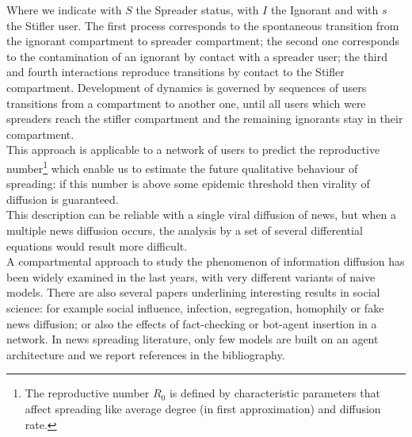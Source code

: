 Where we indicate with $S$ the Spreader status, with $I$ the Ignorant and with $s$ the Stifler user. 
The first process corresponds to the spontaneous transition from the ignorant compartment to spreader compartment;
 the second one corresponds to the contamination of an ignorant by contact with a spreader user; 
the third and fourth interactions reproduce transitions by contact to the Stifler compartment.
Development of dynamics is governed by sequences of users transitions from a compartment to another one, until all users which were spreaders reach the stifler compartment and the remaining ignorants stay in their compartment.\\
This approach is applicable to a network of users to predict the reproductive 
number\footnote{The reproductive number $R_{0}$ is defined by characteristic parameters that affect spreading like average degree (in first approximation) and diffusion rate. } 
which enable us to estimate the future qualitative behaviour of spreading: 
if this number is above some epidemic threshold then virality of diffusion is guaranteed.\\
This description can be reliable with a single viral diffusion of news, but when a
multiple news diffusion occurs, the analysis by a set of several differential equations would result more difficult.  
 \\ A compartmental approach to study the phenomenon of information diffusion has been widely examined in the last years, with very different variants of naive models.
There are also several papers underlining interesting results in social science: for example social influence, infection, segregation, homophily or fake news diffusion; or also the effects of fact-checking or bot-agent insertion in a network.
 In news spreading literature, only few models are built on an agent architecture and we report references in the bibliography.


